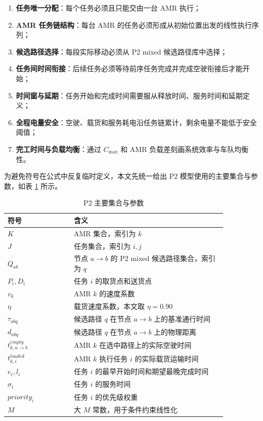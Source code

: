 \begin{enumerate}
  \item \textbf{任务唯一分配}：每个任务必须且只能交由一台 AMR 执行；
  \item \textbf{AMR 任务链结构}：每台 AMR 的任务必须形成从初始位置出发的线性执行序列；
  \item \textbf{候选路径选择}：每段实际移动必须从 P2 mixed 候选路径库中选择；
  \item \textbf{任务间时间衔接}：后续任务必须等待前序任务完成并完成空驶衔接后才能开始；
  \item \textbf{时间窗与延期}：任务开始和完成时间需要服从释放时间、服务时间和延期定义；
  \item \textbf{全程电量安全}：空驶、载货和服务耗电沿任务链累计，剩余电量不能低于安全阈值；
  \item \textbf{完工时间与负载均衡}：通过 $C_{\max}$ 和 AMR 负载差刻画系统效率与车队均衡性。
\end{enumerate}

为避免符号在公式中反复临时定义，本文先统一给出 P2 模型使用的主要集合与参数，如表 \ref{tab:p2-params} 所示。

\begin{table}[!htbp]
\centering
\small
\begin{tabular}{>{\raggedright\arraybackslash}p{0.26\linewidth}p{0.60\linewidth}}
\toprule
符号 & 含义 \\
\midrule
$K$ & AMR 集合，索引为 $k$ \\
$J$ & 任务集合，索引为 $i,j$ \\
$Q_{ab}$ & 节点 $a\to b$ 的 P2 mixed 候选路径集合，索引为 $q$ \\
$P_i,D_i$ & 任务 $i$ 的取货点和送货点 \\
$v_k$ & AMR $k$ 的速度系数 \\
$\eta$ & 载货速度系数，本文取 $\eta=0.90$ \\
$\tau_{abq}$ & 候选路径 $q$ 在节点 $a\to b$ 上的基准通行时间 \\
$d_{abq}$ & 候选路径 $q$ 在节点 $a\to b$ 上的物理距离 \\
$t^{empty}_{k,a\to b}$ & AMR $k$ 在选中路径上的实际空驶时间 \\
$t^{loaded}_{k,i}$ & AMR $k$ 执行任务 $i$ 的实际载货运输时间 \\
$e_i,l_i$ & 任务 $i$ 的最早开始时间和期望最晚完成时间 \\
$\sigma_i$ & 任务 $i$ 的服务时间 \\
$priority_i$ & 任务 $i$ 的优先级权重 \\
$M$ & 大 $M$ 常数，用于条件约束线性化 \\
\bottomrule
\end{tabular}
\caption{P2 主要集合与参数}
\label{tab:p2-params}
\end{table}

